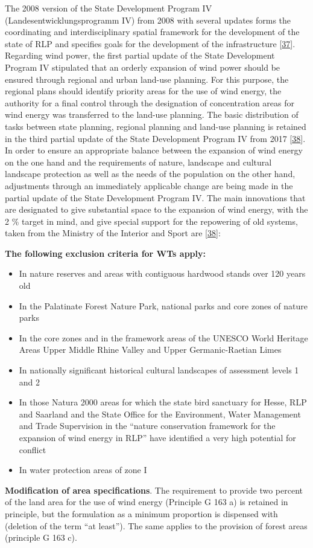 \documentclass[a4paper,11pt]{article}
\providecommand{\tightlist}{%
  \setlength{\itemsep}{0pt}\setlength{\parskip}{0pt}}
\begin{document}
The 2008 version of the State Development Program IV (Landesentwicklungsprogramm IV) from 2008 with several updates forms the coordinating and interdisciplinary spatial framework for the development of the state of RLP and specifies goals for the development of the infrastructure {[}\protect\hyperlink{ref-MinisteriumdesInnernundfurSport.2008}{37}{]}. Regarding wind power, the first partial update of the State Development Program IV stipulated that an orderly expansion of wind power should be ensured through regional and urban land-use planning. For this purpose, the regional plans should identify priority areas for the use of wind energy, the authority for a final control through the designation of concentration areas for wind energy was transferred to the land-use planning. The basic distribution of tasks between state planning, regional planning and land-use planning is retained in the third partial update of the State Development Program IV from 2017 {[}\protect\hyperlink{ref-MinisteriumdesInnernundfurSport.2017}{38}{]}. In order to ensure an appropriate balance between the expansion of wind energy on the one hand and the requirements of nature, landscape and cultural landscape protection as well as the needs of the population on the other hand, adjustments through an immediately applicable change are being made in the partial update of the State Development Program IV. The main innovations that are designated to give substantial space to the expansion of wind energy, with the 2 \% target in mind, and give special support for the repowering of old systems, taken from the Ministry of the Interior and Sport are {[}\protect\hyperlink{ref-MinisteriumdesInnernundfurSport.2017}{38}{]}:

\textbf{The following exclusion criteria for WTs apply:}
\begin{itemize}
\tightlist
\item
  In nature reserves and areas with contiguous hardwood stands over 120 years old
\item
  In the Palatinate Forest Nature Park, national parks and core zones of nature parks
\item
  In the core zones and in the framework areas of the UNESCO World Heritage Areas Upper Middle Rhine Valley and Upper Germanic-Raetian Limes
\item
  In nationally significant historical cultural landscapes of assessment levels 1 and 2
\item
  In those Natura 2000 areas for which the state bird sanctuary for Hesse, RLP and Saarland and the State Office for the Environment, Water Management and Trade Supervision in the ``nature conservation framework for the expansion of wind energy in RLP'' have identified a very high potential for conflict
\item
  In water protection areas of zone I
\end{itemize}
\textbf{Modification of area specifications}. The requirement to provide two percent of the land area for the use of wind energy (Principle G 163 a) is retained in principle, but the formulation as a minimum proportion is dispensed with (deletion of the term ``at least''). The same applies to the provision of forest areas (principle G 163 c).
\end{document}
